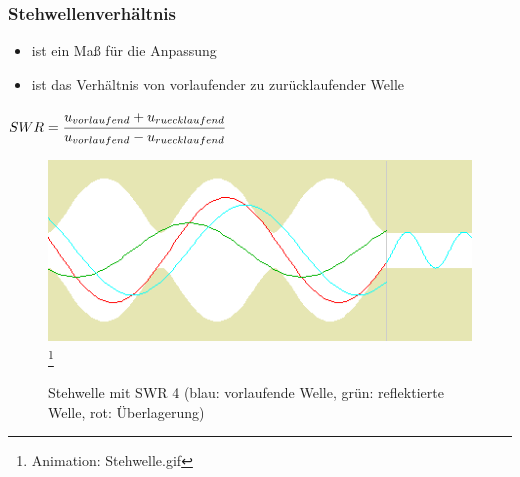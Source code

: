 \begin{frame}
\frametitle{Stehwellenverhältnis}
\begin{itemize}
	\item ist ein Maß für die Anpassung
	\item ist das Verhältnis von vorlaufender zu zurücklaufender Welle
\end{itemize}
\begin{block}{}
  \centering $SWR = \cfrac{u_{vorlaufend}+u_{ruecklaufend}}{u_{vorlaufend}-u_{ruecklaufend}}$ 
\end{block}
\begin{center}
  \begin{figure}
  \includegraphics[width=\textwidth,height=0.3\textheight,keepaspectratio]{e10/Stehwelle-10.png}
  \footnote{Animation: Stehwelle.gif\cite{stehwelle}}
  \caption{\centering Stehwelle mit SWR 4 \newline
           {\footnotesize (blau: vorlaufende Welle, grün: reflektierte Welle, rot: Überlagerung)}}
  \end{figure}
\end{center}
\end{frame}

